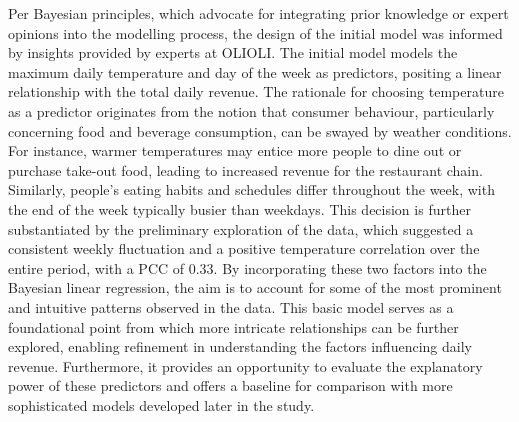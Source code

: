 Per Bayesian principles, which advocate for integrating 
prior knowledge or expert opinions into the modelling process, the design of
the initial model was informed by insights provided by experts at OLIOLI. The
initial model models the maximum daily temperature and day of the week
as predictors, positing a linear relationship with the total daily revenue. The
rationale for choosing temperature as a predictor originates from the notion
that consumer behaviour, particularly concerning food and beverage consumption,
can be swayed by weather conditions. For instance, warmer temperatures may
entice more people to dine out or purchase take-out food,
leading to increased revenue for the restaurant chain. Similarly, people's
eating habits and schedules differ throughout the week, with the end of the
week typically busier than weekdays. This decision is further substantiated by
the preliminary exploration of the data, which suggested a consistent weekly
fluctuation and a positive temperature correlation over the entire period,
with a PCC of 0.33. By incorporating these two factors into the Bayesian linear
regression, the aim is to account for some of the most prominent and intuitive
patterns observed in the data. This basic model serves as a foundational point
from which more intricate relationships can be further explored, enabling
refinement in understanding the factors influencing daily revenue.
Furthermore, it provides an opportunity to evaluate the explanatory power of
these predictors and offers a baseline for comparison with more sophisticated
models developed later in the study.

